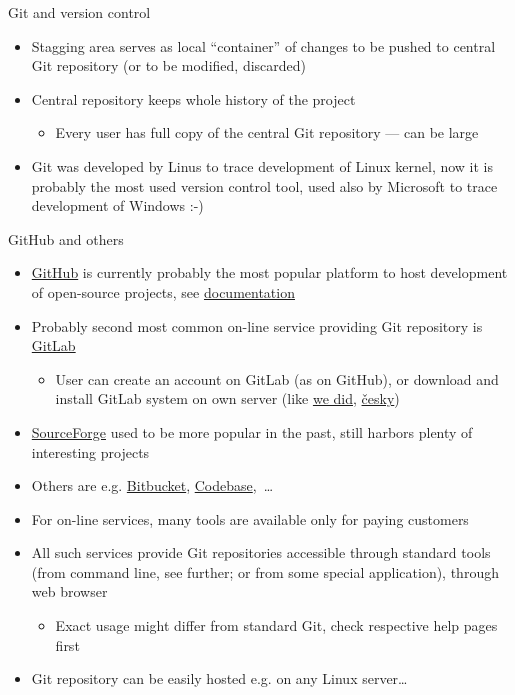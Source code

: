 \documentclass[compress, xelatex, 11pt, xcolor=svgnames, aspectratio=169, url={hyphens, lowtilde}]{beamer}
\begin{document}
\begin{frame}[allowframebreaks]{Git and version control}
\begin{itemize}
		\begin{itemize}
			\item Can be tagged (named), e.g. particular released version of software, or project stage
			\item User can compare any two commits or commit and current state
		\end{itemize}
		\item Stagging area serves as local \enquote{container} of changes to be pushed to central Git repository (or to be modified, discarded)
		\item Central repository keeps whole history of the project
		\begin{itemize}
			\item Every user has full copy of the central Git repository --- can be large
		\end{itemize}
		\item Git was developed by Linus to trace development of Linux kernel, now it is probably the most used version control tool, used also by Microsoft to trace development of Windows :-)
	\end{itemize}
\end{frame}

\begin{frame}{GitHub and others}
	\begin{itemize}
		\item \href{https://github.com/}{GitHub} is currently probably the most popular platform to host development of open-source projects, see \href{https://support.github.com/}{documentation}
		\item Probably second most common on-line service providing Git repository is \href{https://about.gitlab.com/}{GitLab}
		\begin{itemize}
			\item User can create an account on GitLab (as on GitHub), or download and install GitLab system on own server (like \href{https://sorbus.ibot.cas.cz/en/gitlab}{we did}, \href{https://sorbus.ibot.cas.cz/cs/gitlab}{česky})
		\end{itemize}
		\item \href{https://sourceforge.net/}{SourceForge} used to be more popular in the past, still harbors plenty of interesting projects
		\item Others are e.g. \href{https://bitbucket.org/}{Bitbucket}, \href{https://www.codebasehq.com/}{Codebase},~\ldots
		\item For on-line services, many tools are available only for paying customers
		\item All such services provide Git repositories accessible through standard tools (from command line, see further; or from some special application), through web browser
		\begin{itemize}
			\item Exact usage might differ from standard Git, check respective help pages first
		\end{itemize}
		\item Git repository can be easily hosted e.g. on any Linux server\ldots
	\end{itemize}
\end{frame}
\end{document}
